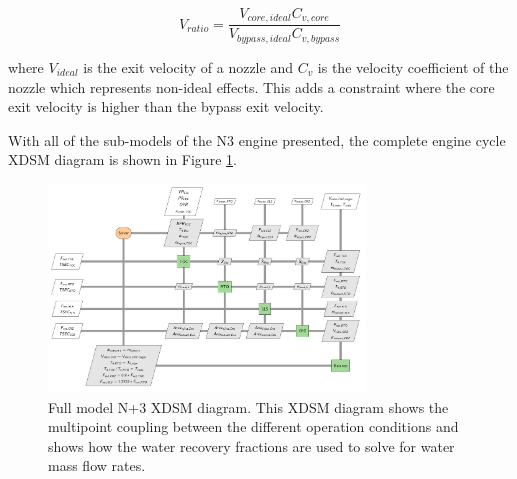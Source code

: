 \documentclass[conf]{new-aiaa}
\begin{document}
\begin{equation}
    V_{ratio} = \frac{V_{core,ideal}C_{v,core}}{V_{bypass,ideal}C_{v,bypass}}
\end{equation}

\noindent
where $V_{ideal}$ is the exit velocity of a nozzle and $C_v$ is the velocity coefficient of the nozzle which represents non-ideal effects.
This adds a constraint where the core exit velocity is higher than the bypass exit velocity.



With all of the sub-models of the N3 engine presented, the complete engine cycle XDSM diagram is shown in Figure \ref{fig:N3_xdsm_full}.

\begin{figure}[hbt!]
    \centering
    \includegraphics[width=0.75\textwidth]{N3_xdsm_full.pdf}
    \caption{
        Full model N+3 XDSM diagram.
        This XDSM diagram shows the multipoint coupling between the different operation conditions and shows how the water recovery fractions are used to solve for water mass flow rates.
    }
    \label{fig:N3_xdsm_full}
\end{figure}
\end{document}
